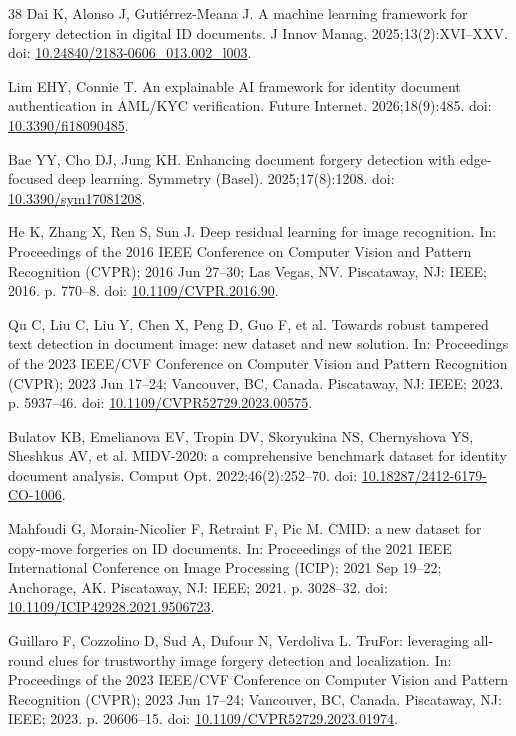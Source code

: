 \documentclass[12pt]{article}
\begin{document}
\begin{thebibliography}{38}
Dai K, Alonso J, Guti\'errez-Meana J. A machine learning framework for forgery detection in digital ID documents. J Innov Manag. 2025;13(2):XVI--XXV. doi: \href{https://doi.org/10.24840/2183-0606_013.002_l003}{10.24840/2183-0606\_013.002\_l003}.

Lim EHY, Connie T. An explainable AI framework for identity document authentication in AML/KYC verification. Future Internet. 2026;18(9):485. doi: \href{https://doi.org/10.3390/fi18090485}{10.3390/fi18090485}.

Bae YY, Cho DJ, Jung KH. Enhancing document forgery detection with edge-focused deep learning. Symmetry (Basel). 2025;17(8):1208. doi: \href{https://doi.org/10.3390/sym17081208}{10.3390/sym17081208}.

He K, Zhang X, Ren S, Sun J. Deep residual learning for image recognition. In: Proceedings of the 2016 IEEE Conference on Computer Vision and Pattern Recognition (CVPR); 2016 Jun 27--30; Las Vegas, NV. Piscataway, NJ: IEEE; 2016. p. 770--8. doi: \href{https://doi.org/10.1109/CVPR.2016.90}{10.1109/CVPR.2016.90}.

Qu C, Liu C, Liu Y, Chen X, Peng D, Guo F, et al. Towards robust tampered text detection in document image: new dataset and new solution. In: Proceedings of the 2023 IEEE/CVF Conference on Computer Vision and Pattern Recognition (CVPR); 2023 Jun 17--24; Vancouver, BC, Canada. Piscataway, NJ: IEEE; 2023. p. 5937--46. doi: \href{https://doi.org/10.1109/CVPR52729.2023.00575}{10.1109/CVPR52729.2023.00575}.

Bulatov KB, Emelianova EV, Tropin DV, Skoryukina NS, Chernyshova YS, Sheshkus AV, et al. MIDV-2020: a comprehensive benchmark dataset for identity document analysis. Comput Opt. 2022;46(2):252--70. doi: \href{https://doi.org/10.18287/2412-6179-CO-1006}{10.18287/2412-6179-CO-1006}.

Mahfoudi G, Morain-Nicolier F, Retraint F, Pic M. CMID: a new dataset for copy-move forgeries on ID documents. In: Proceedings of the 2021 IEEE International Conference on Image Processing (ICIP); 2021 Sep 19--22; Anchorage, AK. Piscataway, NJ: IEEE; 2021. p. 3028--32. doi: \href{https://doi.org/10.1109/ICIP42928.2021.9506723}{10.1109/ICIP42928.2021.9506723}.

Guillaro F, Cozzolino D, Sud A, Dufour N, Verdoliva L. TruFor: leveraging all-round clues for trustworthy image forgery detection and localization. In: Proceedings of the 2023 IEEE/CVF Conference on Computer Vision and Pattern Recognition (CVPR); 2023 Jun 17--24; Vancouver, BC, Canada. Piscataway, NJ: IEEE; 2023. p. 20606--15. doi: \href{https://doi.org/10.1109/CVPR52729.2023.01974}{10.1109/CVPR52729.2023.01974}.


\end{thebibliography}
\end{document}
